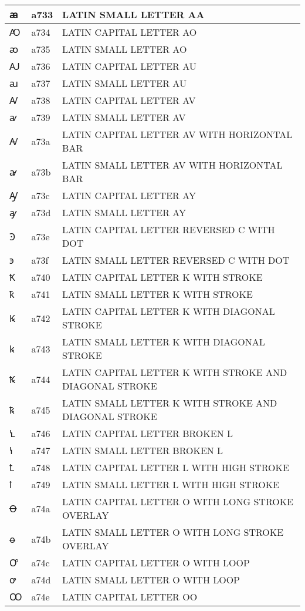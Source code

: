 \documentclass[12pt,letterpaper,openany]{book}
\begin{document}
\begin{center}
\begin{supertabular}{|m{0.25in}|m{0.5in}|m{4in}|}
ꜳ & a733 & LATIN SMALL LETTER AA\\\hline
Ꜵ & a734 & LATIN CAPITAL LETTER AO\\\hline
ꜵ & a735 & LATIN SMALL LETTER AO\\\hline
Ꜷ & a736 & LATIN CAPITAL LETTER AU\\\hline
ꜷ & a737 & LATIN SMALL LETTER AU\\\hline
Ꜹ & a738 & LATIN CAPITAL LETTER AV\\\hline
ꜹ & a739 & LATIN SMALL LETTER AV\\\hline
Ꜻ & a73a & LATIN CAPITAL LETTER AV WITH HORIZONTAL BAR\\\hline
ꜻ & a73b & LATIN SMALL LETTER AV WITH HORIZONTAL BAR\\\hline
Ꜽ & a73c & LATIN CAPITAL LETTER AY\\\hline
ꜽ & a73d & LATIN SMALL LETTER AY\\\hline
Ꜿ & a73e & LATIN CAPITAL LETTER REVERSED C WITH DOT\\\hline
ꜿ & a73f & LATIN SMALL LETTER REVERSED C WITH DOT\\\hline
Ꝁ & a740 & LATIN CAPITAL LETTER K WITH STROKE\\\hline
ꝁ & a741 & LATIN SMALL LETTER K WITH STROKE\\\hline
Ꝃ & a742 & LATIN CAPITAL LETTER K WITH DIAGONAL STROKE\\\hline
ꝃ & a743 & LATIN SMALL LETTER K WITH DIAGONAL STROKE\\\hline
Ꝅ & a744 & LATIN CAPITAL LETTER K WITH STROKE AND DIAGONAL STROKE\\\hline
ꝅ & a745 & LATIN SMALL LETTER K WITH STROKE AND DIAGONAL STROKE\\\hline
Ꝇ & a746 & LATIN CAPITAL LETTER BROKEN L\\\hline
ꝇ & a747 & LATIN SMALL LETTER BROKEN L\\\hline
Ꝉ & a748 & LATIN CAPITAL LETTER L WITH HIGH STROKE\\\hline
ꝉ & a749 & LATIN SMALL LETTER L WITH HIGH STROKE\\\hline
Ꝋ & a74a & LATIN CAPITAL LETTER O WITH LONG STROKE OVERLAY\\\hline
ꝋ & a74b & LATIN SMALL LETTER O WITH LONG STROKE OVERLAY\\\hline
Ꝍ & a74c & LATIN CAPITAL LETTER O WITH LOOP\\\hline
ꝍ & a74d & LATIN SMALL LETTER O WITH LOOP\\\hline
Ꝏ & a74e & LATIN CAPITAL LETTER OO\\\hline

\end{supertabular}
\end{center}
\end{document}
